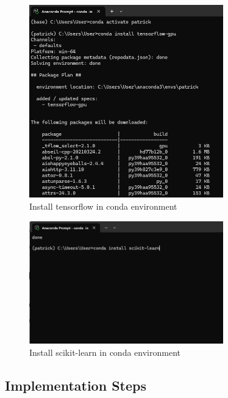 \begin{ZhChapter}
\begin{figure}[htbp]
    \centering
    \includegraphics[width = 0.75\textwidth]{image/tensorflow.png}
    \caption{Install tensorflow in conda environment}
    \label{fig: tensorflow}
\end{figure}

\begin{figure}[htbp]
    \centering
    \includegraphics[width = 0.75\textwidth]{image/sklearn.png}
    \caption{Install scikit-learn in conda environment}
    \label{fig: sklearn}
\end{figure}

\subsection{Implementation Steps}


\end{ZhChapter}
